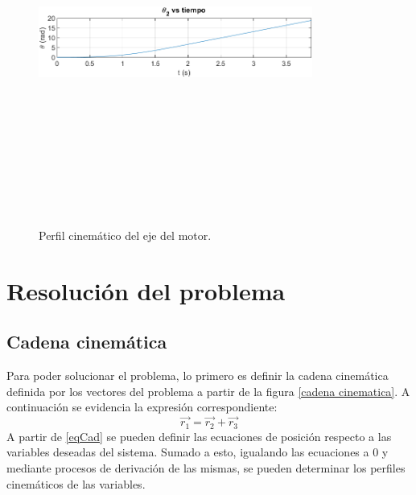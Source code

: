 \documentclass[12pt]{article}
\begin{document}
        \vspace{-25pt}
        \begin{figure} [H]
        \centerline{\includegraphics[width=9cm, height=12cm,keepaspectratio]{Perfiles/perfil cinematico posicion.png}}
        \caption{Perfil cinemático del eje del motor.}
        \label{}
    \end{figure}
\section{Resolución del problema}
\subsection{Cadena cinemática} \label{secCadenaCinematica}
Para poder solucionar el problema, lo primero es definir la cadena cinemática definida por los vectores del problema a partir de la figura \ref{cadena cinematica}. A continuación se evidencia la expresión correspondiente:
\begin{equation}
    \vec{r_1}=\vec{r_2}+\vec{r_3} \label{eqCad}
\end{equation}
A partir de \eqref{eqCad} se pueden definir las ecuaciones de posición respecto a las variables deseadas del sistema. Sumado a esto, igualando las ecuaciones a 0 y mediante procesos de derivación de las mismas, se pueden determinar los perfiles cinemáticos de las variables.
\end{document}
